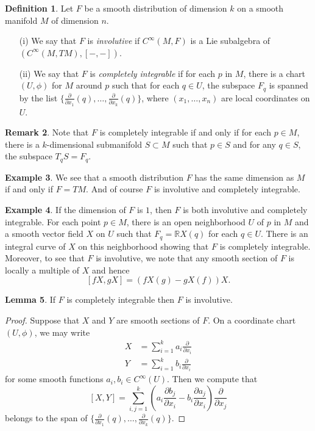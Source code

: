 \documentclass{amsart}
\numberwithin{equation}{section}
\theoremstyle{definition}
\newtheorem{definition}{Definition} [section]
\newtheorem{example}[definition]{Example}
\newtheorem{remark}[definition]{Remark}
\theoremstyle{theorem}
\newtheorem{lemma}[definition]{Lemma}
\begin{document}
\begin{definition}
Let $F$ be a smooth distribution of dimension $k$ on a smooth manifold $M$ of dimension $n$. 
\begin{enumerate}
\item[(i)] We say that $F$ is {\em involutive} if $C^\infty(M,F)$ is a Lie subalgebra of 
           $(C^\infty(M,TM), [-,-])$. 
\item[(ii)] We say that $F$ is {\em completely integrable} if for each $p$ in $M$, there is a chart 
$(U,\phi)$ for $M$ around $p$ such that for each $q \in U$, the subspace $F_q$ is spanned by the list 
$\{\frac{\partial}{\partial x_1}(q), \ldots, \frac{\partial}{\partial x_k}(q)\}$, where
$(x_1, \ldots, x_n)$ are local coordinates on $U$. 
\end{enumerate}
\end{definition}

\begin{remark}
Note that $F$ is completely integrable if and only if for each $p \in M$, there is a $k$-dimensional 
submanifold $S \subset M$ such that $p\in S$ and for any $q \in S$, the subspace $T_qS = F_q$. 
\end{remark}

\begin{example}
We see that a smooth distribution $F$ has the same dimension as $M$ if and only if $F = TM$. 
And of course  $F$ is involutive and completely integrable. 
\end{example}

\begin{example}
If the dimension of $F$ is $1$, then $F$ is both involutive and completely integrable. 
For each point $p \in M$, there is an open neighborhood $U$ of $p$ in $M$ and a smooth vector field $X$ on $U$ such that $F_q = \mathbb{R}X(q)$ for each $q \in U$. There is an integral curve of $X$ on this neighborhood showing that $F$ is completely integrable. Moreover, to see that $F$ is involutive, we note that any smooth section of $F$ is locally a multiple of $X$ and hence 
\[
[fX, gX] = (fX(g) - gX(f))X.
\]  
\end{example}

\begin{lemma}
If $F$ is completely integrable then $F$ is involutive. 
\end{lemma}

\begin{proof}
Suppose that $X$ and $Y$ are smooth sections of $F$. On a coordinate chart $(U,\phi)$, we may write 
\begin{align*}
X &= \sum_{i=1}^k a_i \frac{\partial}{\partial x_i} \\
Y &= \sum_{i=1}^k b_i \frac{\partial}{\partial x_i}
\end{align*}
for some smooth functions $a_i, b_i \in C^\infty(U)$. Then we compute that
\[
[X,Y] = \sum_{i,j=1}^k \left(a_i \frac{\partial b_j}{\partial x_i} - b_i \frac{\partial a_j}{\partial x_i}\right) \frac{\partial}{\partial x_j}
\]
belongs to the span of $\{\frac{\partial}{\partial x_1}(q), \ldots, \frac{\partial}{\partial x_k}(q)\}$. 
\end{proof}
\end{document}
